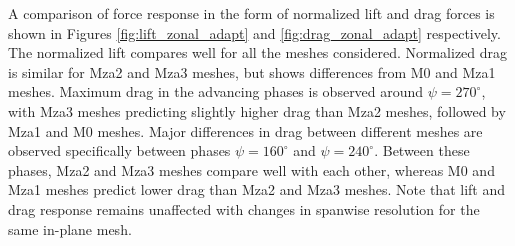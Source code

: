 
A comparison of force response in the form of normalized lift and drag forces is shown in Figures \ref{fig:lift_zonal_adapt} and \ref{fig:drag_zonal_adapt} respectively. The normalized lift compares well for all the meshes considered. Normalized drag is similar for Mza2 and Mza3 meshes, but shows differences from M0 and Mza1 meshes. Maximum drag in the advancing phases is observed around $\psi=270^\circ$, with Mza3 meshes predicting slightly higher drag than Mza2 meshes, followed by Mza1 and M0 meshes. Major differences in drag between different meshes are observed specifically between phases $\psi=160^\circ$ and $\psi=240^\circ$. Between these phases, Mza2 and Mza3 meshes compare well with each other, whereas M0 and Mza1 meshes predict lower drag than Mza2 and Mza3 meshes. Note that lift and drag response remains unaffected with changes in spanwise resolution for the same in-plane mesh.

